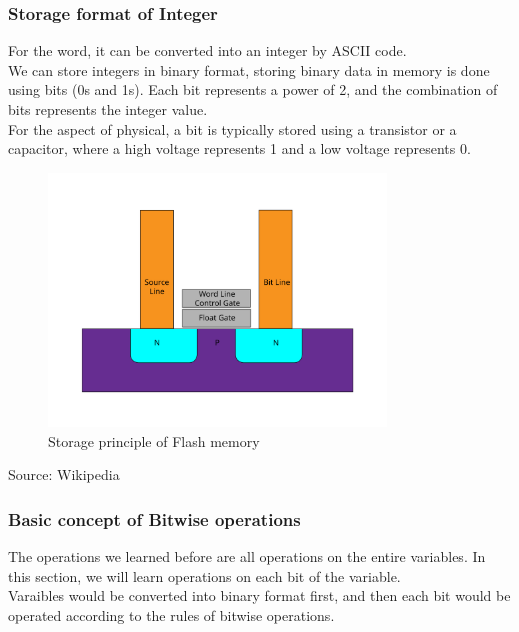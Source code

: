 \documentclass[xcolor=dvipsnames]{beamer}
\begin{document}
    \begin{frame}
        \frametitle{Storage format of Integer}
        For the word, it can be converted into an integer by ASCII code.\\
        We can store integers in binary format, storing binary data in memory is done using bits (0s and 1s). Each bit represents a power of 2, and the combination of bits represents the integer value.\\
        For the aspect of physical, a bit is typically stored using a transistor or a capacitor, where a high voltage represents 1 and a low voltage represents 0.\\
    \end{frame}
    \begin{frame}
        \begin{figure}
            \centering
            \includegraphics[width=0.8\textwidth]{src/storage.png}
            \caption{Storage principle of Flash memory}
        \end{figure}
        \footnotesize
        Source: Wikipedia
    \end{frame}
    \begin{frame}
        \frametitle{Basic concept of Bitwise operations}
            The operations we learned before are all operations on the entire variables. In this section, we will learn operations on each \alert{bit} of the variable.\\
            Varaibles would be converted into binary format first, and then each bit would be operated according to the rules of bitwise operations.\\
    \end{frame}
\end{document}
